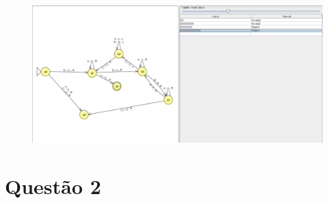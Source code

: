 \documentclass{../sftex/sftex}
\begin{document}
\begin{itemize}
        \begin{figure}[htbp]
            \centering
            \includegraphics[width=\textwidth]{images/questao1_inputs.png}
        \end{figure}

\end{itemize}

\section*{Questão 2}
\end{document}
